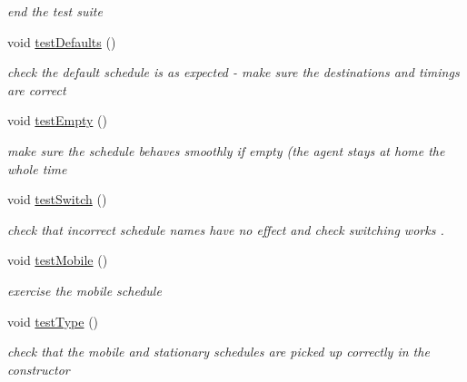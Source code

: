 \begin{DoxyCompactItemize}
\begin{DoxyCompactList}\small\item\em end the test suite \end{DoxyCompactList}\item 
\mbox{\label{classtravelScheduleTest_a20320a46b0a0a9cd70e643f1ebe0ee0a}} 
void \mbox{\hyperlink{classtravelScheduleTest_a20320a46b0a0a9cd70e643f1ebe0ee0a}{test\+Defaults}} ()
\begin{DoxyCompactList}\small\item\em check the default schedule is as expected -\/ make sure the destinations and timings are correct \end{DoxyCompactList}\item 
\mbox{\label{classtravelScheduleTest_a9a54489b2ffb494a08bbcfa9391e0c8d}} 
void \mbox{\hyperlink{classtravelScheduleTest_a9a54489b2ffb494a08bbcfa9391e0c8d}{test\+Empty}} ()
\begin{DoxyCompactList}\small\item\em make sure the schedule behaves smoothly if empty (the agent stays at home the whole time \end{DoxyCompactList}\item 
void \mbox{\hyperlink{classtravelScheduleTest_afa04fc9d3f86668e36c74a1f27c2d5aa}{test\+Switch}} ()
\begin{DoxyCompactList}\small\item\em check that incorrect schedule names have no effect and check switching works . \end{DoxyCompactList}\item 
void \mbox{\hyperlink{classtravelScheduleTest_a7d457e4ae5c44853c450860284993a57}{test\+Mobile}} ()
\begin{DoxyCompactList}\small\item\em exercise the mobile schedule \end{DoxyCompactList}\item 
void \mbox{\hyperlink{classtravelScheduleTest_a66b5ac55f22c6d892798936d634d2316}{test\+Type}} ()
\begin{DoxyCompactList}\small\item\em check that the mobile and stationary schedules are picked up correctly in the constructor \end{DoxyCompactList}\end{DoxyCompactItemize}

